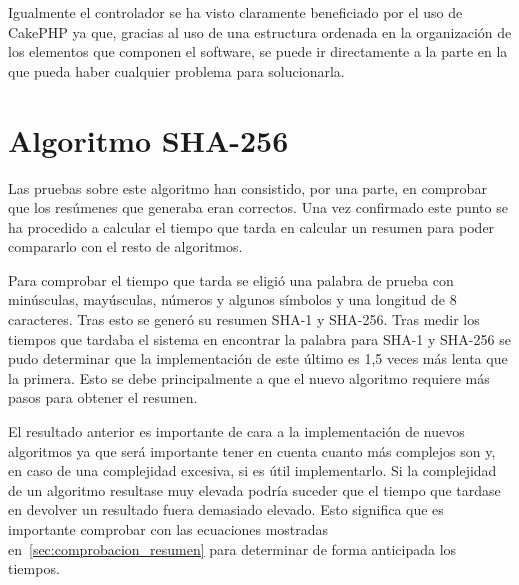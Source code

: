 Igualmente el controlador se ha visto claramente beneficiado por el uso de CakePHP ya que, gracias al uso de una estructura ordenada en la organización de los elementos que componen el software, se puede ir directamente a la parte en la que pueda haber cualquier problema para solucionarla.

\section{Algoritmo SHA-256}

Las pruebas sobre este algoritmo han consistido, por una parte, en comprobar que los resúmenes que generaba eran correctos. Una vez confirmado este punto se ha procedido a calcular el tiempo que tarda en calcular un resumen para poder compararlo con el resto de algoritmos.

Para comprobar el tiempo que tarda se eligió una palabra de prueba con minúsculas, mayúsculas, números y algunos símbolos y una longitud de 8 caracteres. Tras esto se generó su resumen SHA-1 y SHA-256. Tras medir los tiempos que tardaba el sistema en encontrar la palabra para SHA-1 y SHA-256 se pudo determinar que la implementación de este último es 1,5 veces más lenta que la primera. Esto se debe principalmente a que el nuevo algoritmo requiere más pasos para obtener el resumen.

El resultado anterior es importante de cara a la implementación de nuevos algoritmos ya que será importante tener en cuenta cuanto más complejos son y, en caso de una complejidad excesiva, si es útil implementarlo. Si la complejidad de un algoritmo resultase muy elevada podría suceder que el tiempo que tardase en devolver un resultado fuera demasiado elevado. Esto significa que es importante comprobar con las ecuaciones mostradas en~\ref{sec:comprobacion_resumen} para determinar de forma anticipada los tiempos.
